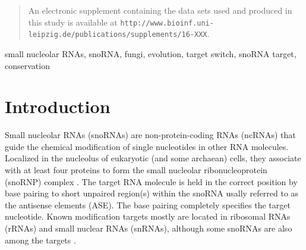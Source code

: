 \documentclass[preprint,3p,times,twocolumn]{elsarticle}
\newcommand{\url}[1]{\texttt{\small #1}}
\begin{document}
\begin{frontmatter}
\begin{abstract}
  
  An electronic supplement containing the data sets used and produced in
  this study is available at
  \url{http://www.bioinf.uni-leipzig.de/publications/supplements/16-XXX}. 
\end{abstract}

\begin{keyword}
  small nucleolar RNAs, snoRNA, fungi, evolution, target switch, snoRNA target, 	
  conservation	
\end{keyword}

\end{frontmatter}


\section{Introduction}

Small nucleolar RNAs (snoRNAs) are non-protein-coding RNAs (ncRNAs) that
guide the chemical modification of single nucleotides in other RNA
molecules.  Localized in the nucleolus of eukaryotic (and some archaean)
cells, they associate with at least four proteins to form the small
nucleolar ribonucleoprotein (snoRNP) complex \cite{****}.  The target RNA
molecule is held in the correct position by base pairing to short unpaired
region(s) within the snoRNA usally referred to as the antisense elements
(ASE). The base pairing completely specifies the target nucleotide. Known
modification targets mostly are located in ribosomal RNAs (rRNAs) and small
nuclear RNAs (snRNAs), although some snoRNAs  are also
among the targets \cite{****}.
\end{document}

